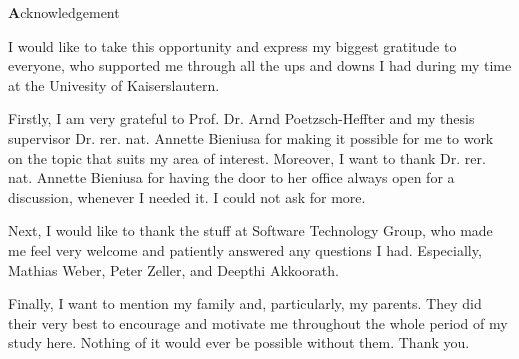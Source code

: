 
\begin{center}
{\Large \textbf Acknowledgement}
\end{center}
\vspace{1cm}

I would like to take this opportunity and express my biggest gratitude to everyone, who supported me through all the ups and downs I had during my time at the Univesity of Kaiserslautern. 

Firstly, I am very grateful to Prof. Dr. Arnd Poetzsch-Heffter and my thesis supervisor Dr. rer. nat. Annette Bieniusa for making it possible for me to work on the topic that suits my area of interest. Moreover, I want to thank Dr. rer. nat. Annette Bieniusa for having the door to her office always open for a discussion, whenever I needed it. I could not ask for more.

Next, I would like to thank the stuff at Software Technology Group, who made me feel very welcome and patiently answered any questions I had. Especially, Mathias Weber, Peter Zeller, and Deepthi Akkoorath.

Finally, I want to mention my family and, particularly, my parents. They did their very best to encourage and motivate me throughout the whole period of my study here. Nothing of it would ever be possible without them. Thank you.